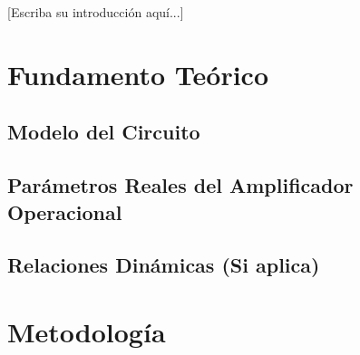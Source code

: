 \documentclass[conference]{IEEEtran}
\begin{document}
[Escriba su introducción aquí...]

\section{Fundamento Teórico}

\subsection{Modelo del Circuito}
%

\subsection{Parámetros Reales del Amplificador Operacional}

\subsection{Relaciones Dinámicas (Si aplica)}

\section{Metodología}
\end{document}
